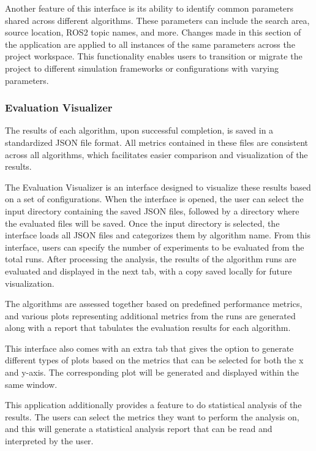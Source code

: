 \documentclass[../report.tex]{subfiles}
\begin{document}
    Another feature of this interface is its ability to identify common parameters shared across different algorithms. These parameters can include the search area, source location, ROS2 
    topic names, and more. Changes made in this section of the application are applied to all instances of the same parameters across the project workspace. This functionality enables users 
    to transition or migrate the project to different simulation frameworks or configurations with varying parameters.

    \subsubsection{Evaluation Visualizer}

    The results of each algorithm, upon successful completion, is saved in a standardized JSON file format. All metrics contained in these files are consistent across all algorithms, which facilitates easier 
    comparison and visualization of the results.

    The Evaluation Visualizer is an interface designed to visualize these results based on a set of configurations. When the interface is opened, the user can select the input directory containing 
    the saved JSON files, followed by a directory where the evaluated files will be saved. Once the input directory is selected, the interface loads all JSON files and categorizes them by algorithm
    name. From this interface, users can specify the number of experiments to be evaluated from the total runs. After processing the analysis, the results of the algorithm runs are evaluated and 
    displayed in the next tab, with a copy saved locally for future visualization.

    The algorithms are assessed together based on predefined performance metrics, and various plots representing additional metrics from the runs are generated along with a report that tabulates 
    the evaluation results for each algorithm. 

    This interface also comes with an extra tab that gives the option to generate different types of plots based on the metrics that can be selected for both the x and y-axis. The corresponding 
    plot will be generated and displayed within the same window.

    This application additionally provides a feature to do statistical analysis of the results. The users can select the metrics they want to perform the analysis on, and this will generate a 
    statistical analysis report that can be read and interpreted by the user.
\end{document}
